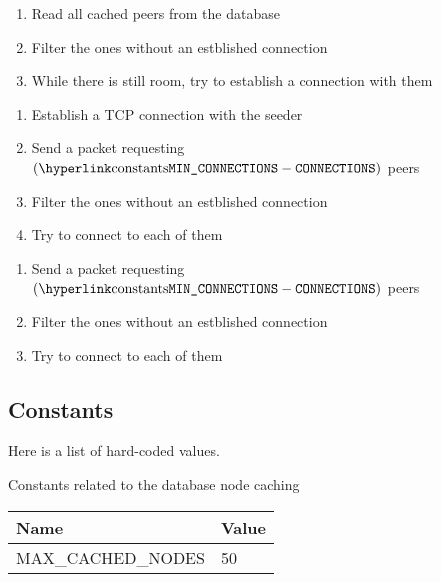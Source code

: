 \documentclass[../documentation.tex]{subfiles}
\begin{document}
\begin{enumerate}
    \item Read all cached peers from the database
    \item Filter the ones without an estblished connection
    \item While there is still room, try to establish a connection with them
\end{enumerate}

\begin{enumerate}
    \item Establish a TCP connection with the seeder
    \item Send a  packet requesting
        \((\text{\const{MIN\_CONNECTIONS}} - \text{\texttt{CONNECTIONS}})\) peers
    \item Filter the ones without an estblished connection
    \item Try to connect to each of them
\end{enumerate}

\begin{enumerate}
    \item Send a  packet requesting
        \((\text{\const{MIN\_CONNECTIONS}} - \text{\texttt{CONNECTIONS}})\) peers
    \item Filter the ones without an estblished connection
    \item Try to connect to each of them
\end{enumerate}


\pagebreak

\hypertarget{constants}{}
\subsection{Constants}

Here is a list of hard-coded values.

Constants related to the database node caching

\bgroup{}
\def\arraystretch{1.25}
\begin{tabular}{|l|l|}
    \hline
    \textbf{Name} & \textbf{Value}
    \\ \hline
    MAX\_CACHED\_NODES & 50
    \\ \hline
\end{tabular}
\egroup{}
\end{document}
